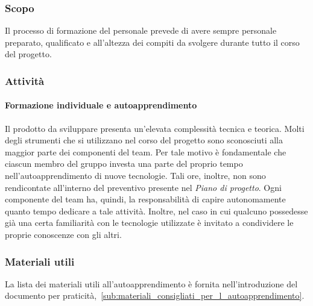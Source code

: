 \documentclass[../../norme-di-progetto.tex]{subfiles}
\begin{document}
\subsubsection{Scopo}%
\label{subs:formazione_del_personale/scopo}

Il processo di formazione del personale prevede di avere sempre personale preparato, qualificato e all'altezza dei compiti da svolgere durante tutto il corso del progetto.

\subsubsection{Attività}%
\label{subs:attivita}

\paragraph{Formazione individuale e autoapprendimento}%
\label{par:formazione_individuale_e_autoapprendimento}

Il prodotto da sviluppare presenta un'elevata complessità tecnica e teorica.
Molti degli strumenti che si utilizzano nel corso del progetto sono sconosciuti alla maggior parte dei componenti del team.
Per tale motivo è fondamentale che ciascun membro del gruppo investa una parte del proprio tempo nell'autoapprendimento di nuove tecnologie.
Tali ore, inoltre, non sono rendicontate all'interno del preventivo presente nel \textit{Piano di progetto}.
Ogni componente del team ha, quindi, la responsabilità di capire autonomamente quanto tempo dedicare a tale attività.
Inoltre, nel caso in cui qualcuno possedesse già una certa familiarità con le tecnologie utilizzate è invitato a condividere le proprie conoscenze con gli altri.

\subsubsection{Materiali utili}%
\label{subs:materiali_utili}

La lista dei materiali utili all'autoapprendimento è fornita nell'introduzione del documento per praticità,~\ref{sub:materiali_consigliati_per_l_autoapprendimento}.
\end{document}
